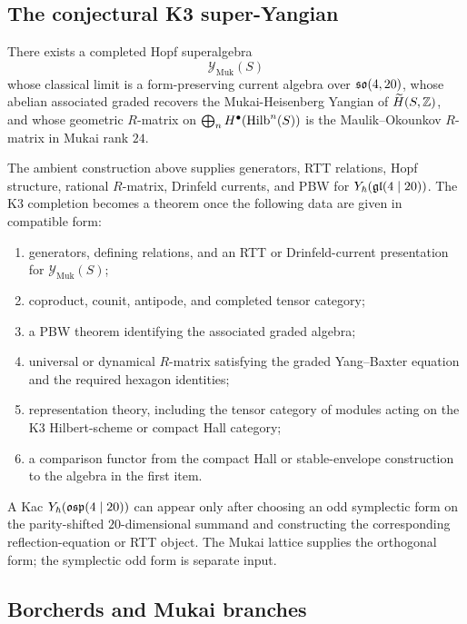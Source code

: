 \subsection*{The conjectural K3 super-Yangian}

\begin{conjecture}
\label{conj:mukai-super-yangian-completion}
There exists a completed Hopf superalgebra
\[
  \mathcal Y_{\mathrm{Muk}}(S)
\]
whose classical limit is a form-preserving current algebra over
\(\mathfrak{so}(4,20)\), whose abelian associated graded recovers the
Mukai-Heisenberg Yangian of \(\widetilde H(S,\mathbb{Z})\), and whose
geometric \(R\)-matrix on \(\bigoplus_n H^\bullet(\mathrm{Hilb}^n(S))\) is the
Maulik--Okounkov \(R\)-matrix in Mukai rank \(24\).
\end{conjecture}

The ambient construction above supplies generators, RTT relations,
Hopf structure, rational \(R\)-matrix, Drinfeld currents, and PBW for
\(Y_\hbar(\mathfrak{gl}(4\mid 20))\).  The K3 completion becomes a theorem once
the following data are given in compatible form:
\begin{enumerate}
\item generators, defining relations, and an RTT or Drinfeld-current
presentation for \(\mathcal Y_{\mathrm{Muk}}(S)\);
\item coproduct, counit, antipode, and completed tensor category;
\item a PBW theorem identifying the associated graded algebra;
\item universal or dynamical \(R\)-matrix satisfying the graded
Yang--Baxter equation and the required hexagon identities;
\item representation theory, including the tensor category of modules
acting on the K3 Hilbert-scheme or compact Hall category;
\item a comparison functor from the compact Hall or stable-envelope
construction to the algebra in the first item.
\end{enumerate}

A Kac \(Y_\hbar(\mathfrak{osp}(4\mid 20))\) can appear only after choosing an odd
symplectic form on the parity-shifted \(20\)-dimensional summand and
constructing the corresponding reflection-equation or RTT object.  The
Mukai lattice supplies the orthogonal form; the symplectic odd form is
separate input.

\subsection*{Borcherds and Mukai branches}

